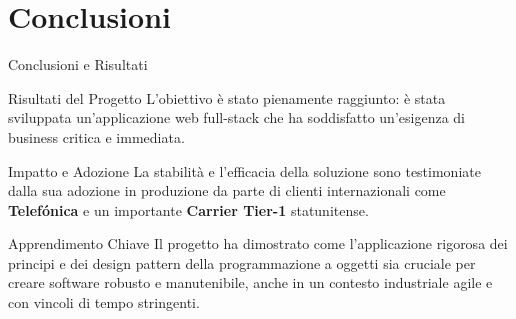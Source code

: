 \documentclass[8pt]{beamer}
\begin{document}
\section{Conclusioni}

\begin{frame}{Conclusioni e Risultati}
  \begin{block}{Risultati del Progetto}
    L'obiettivo è stato pienamente raggiunto: è stata sviluppata un'applicazione web full-stack che ha soddisfatto un'esigenza di business critica e immediata.
  \end{block}

  \begin{exampleblock}{Impatto e Adozione}
    La stabilità e l'efficacia della soluzione sono testimoniate dalla sua adozione in produzione da parte di clienti internazionali come \textbf{Telefónica} e un importante \textbf{Carrier Tier-1} statunitense.
  \end{exampleblock}

  \begin{alertblock}{Apprendimento Chiave}
    Il progetto ha dimostrato come l'applicazione rigorosa dei principi e dei design pattern della programmazione a oggetti sia cruciale per creare software robusto e manutenibile, anche in un contesto industriale agile e con vincoli di tempo stringenti.
  \end{alertblock}
\end{frame}
\end{document}
